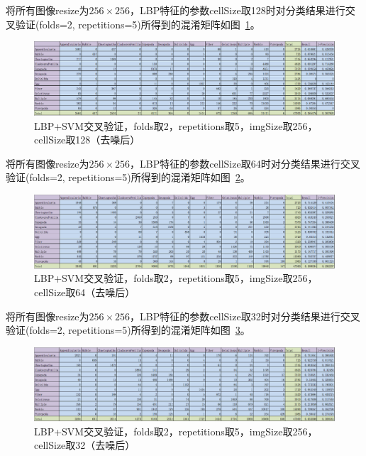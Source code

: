 \documentclass[12pt]{article}
\begin{document}
将所有图像resize为$256 \times 256$，LBP特征的参数cellSize取128时对分类结果进行交叉验证(folds=2, repetitions=5)所得到的混淆矩阵如图~\ref{fig:LBP-SVM-2-folds-5-repetitions-128-256-noNoise}。
\begin{figure}[!ht]
\centering
\includegraphics[width=1.0\linewidth]{LBP-SVM-2-folds-5-repetitions-128-256-noNoise}
\caption{LBP+SVM交叉验证，folds取2，repetitions取5，imgSize取256，cellSize取128（去噪后）}
\label{fig:LBP-SVM-2-folds-5-repetitions-128-256-noNoise}
\end{figure}

将所有图像resize为$256 \times 256$，LBP特征的参数cellSize取64时对分类结果进行交叉验证(folds=2, repetitions=5)所得到的混淆矩阵如图~\ref{fig:LBP-SVM-2-folds-5-repetitions-64-256-noNoise}。
\begin{figure}[!ht]
\centering
\includegraphics[width=1.0\linewidth]{LBP-SVM-2-folds-5-repetitions-64-256-noNoise}
\caption{LBP+SVM交叉验证，folds取2，repetitions取5，imgSize取256，cellSize取64（去噪后）}
\label{fig:LBP-SVM-2-folds-5-repetitions-64-256-noNoise}
\end{figure}

将所有图像resize为$256 \times 256$，LBP特征的参数cellSize取32时对分类结果进行交叉验证(folds=2, repetitions=5)所得到的混淆矩阵如图~\ref{fig:LBP-SVM-2-folds-5-repetitions-32-256-noNoise}。
\begin{figure}[!ht]
\centering
\includegraphics[width=1.0\linewidth]{LBP-SVM-2-folds-5-repetitions-32-256-noNoise}
\caption{LBP+SVM交叉验证，folds取2，repetitions取5，imgSize取256，cellSize取32（去噪后）}
\label{fig:LBP-SVM-2-folds-5-repetitions-32-256-noNoise}
\end{figure}
\end{document}
